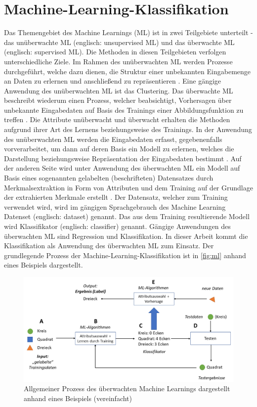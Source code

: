 \section{Machine-Learning-Klassifikation}
\label{classification}

Das Themengebiet des Machine Learnings (ML) ist in zwei Teilgebiete unterteilt - das unüberwachte ML (englisch: unsupervised ML) und das überwachte ML (englisch: supervised ML). Die Methoden in diesen Teilgebieten verfolgen unterschiedliche Ziele. Im Rahmen des unüberwachten ML werden Prozesse durchgeführt, welche dazu dienen, die Struktur einer unbekannten Eingabemenge an Daten zu erlernen und anschließend zu repräsentieren \cite{Sammut2017}. Eine gängige Anwendung des unüberwachten ML ist das Clustering. Das überwachte ML beschreibt wiederum einen Prozess, welcher beabsichtigt, Vorhersagen über unbekannte Eingabedaten auf Basis des Trainings einer Abbildungsfunktion zu treffen \cite{Sammut2017}. Die Attribute \glqq unüberwacht\grqq{} und \glqq überwacht\grqq{} erhalten die Methoden aufgrund ihrer Art des Lernens beziehungsweise des Trainings. In der Anwendung des unüberwachten ML werden die Eingabedaten erfasst, gegebenenfalls vorverarbeitet, um dann auf deren Basis ein Modell zu erlernen, welches die Darstellung beziehungsweise Repräsentation der Eingabedaten bestimmt \cite{Alpaydin2010}. Auf der anderen Seite wird unter Anwendung des überwachten ML ein Modell auf Basis eines sogenannten \glqq gelabelten\grqq{} (beschrifteten) Datensatzes durch Merkmalsextraktion in Form von Attributen und dem Training auf der Grundlage der extrahierten Merkmale erstellt \cite{Alpaydin2010}. Der Datensatz, welcher zum Training verwendet wird, wird im gängigen Sprachgebrauch des Machine Learning Datenset (englisch: dataset) genannt. Das aus dem Training resultierende Modell wird Klassifikator (englisch: classifier) genannt. Gängige Anwendungen des überwachten ML sind Regression und Klassifikation. In dieser Arbeit kommt die Klassifikation als Anwendung des überwachten ML zum Einsatz. Der grundlegende Prozess der Machine-Learning-Klassifikation ist in \autoref{fig:ml} anhand eines Beispiels dargestellt.

\begin{figure}[ht]
    \centering
    \captionsetup{justification=centering,margin=2cm}
    \includegraphics[width=\textwidth]{images/ML}
    \caption{Allgemeiner Prozess des überwachten Machine Learnings dargestellt anhand eines Beispiels (vereinfacht)}\label{fig:ml}
\end{figure}

